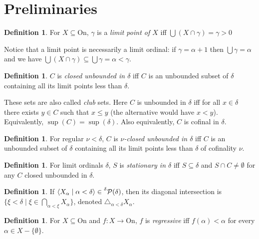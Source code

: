 \documentclass{article}
\theoremstyle{definition}
\newtheorem{definition}[theorem]{Definition}
\theoremstyle{remark}
\newtheorem*{remark}{Remark}
\begin{document}
\section{Preliminaries}
\begin{definition}

	For $X\subseteq \textrm{On}$, $\gamma$ is a \emph{limit point of $X$} iff $\bigcup (X \cap \gamma) = \gamma > 0$
\end{definition}
	Notice that a limit point is necessarily a limit ordinal: if $\gamma = \alpha +1$ then $\bigcup \gamma = \alpha$ and we have $ \bigcup (X \cap \gamma) \subseteq \bigcup \gamma  = \alpha < \gamma$.
\begin{definition}
	$C$ is \emph{closed unbounded in $\delta$} iff $C$ is an unbounded subset of $\delta$ containing all its limit points less than $\delta$. 
\end{definition}
These sets are also called \emph{club} sets. Here $C$ is unbounded in $\delta$ iff for all $x\in \delta$ there exists $y \in C$ such that $x\leq y$ (the alternative would have $x<y$). Equivalently, $\sup(C)=\sup(\delta)$. Also equivalently,  $C$ is cofinal in $\delta$.
\begin{definition}
	For regular $\nu < \delta$, $C$ is \emph{$\nu$-closed unbounded in $\delta$} iff $C$ is an unbounded subset of $\delta$ containing all its limit points less than $\delta$ of cofinality $\nu$. 
\end{definition}
\begin{definition}
	For limit ordinals $\delta$, $S$ is \emph{stationary in $\delta$} iff $S \subseteq \delta$ and $S\cap C \neq \emptyset$ for any $C$ closed unbounded in $\delta$. 
\end{definition}
\begin{definition}
	If $\langle X_\alpha \mid \alpha < \delta \rangle \in \prescript{\delta}{} {\mathcal{P}(\delta)}$, then its diagonal intersection is $\{ \xi < \delta \mid \xi \in \bigcap_{\alpha<\xi} X_\alpha \}$, denoted $\triangle_{\alpha < \delta} X_\alpha$.
\end{definition}

\begin{definition}
	For $X\subseteq \text{On}$ and $f: X \to \text{On}$, $f$ is \emph{regressive} iff $f(\alpha) < \alpha$ for every $\alpha \in X - \{\emptyset \}$.
\end{definition}
\end{document}
